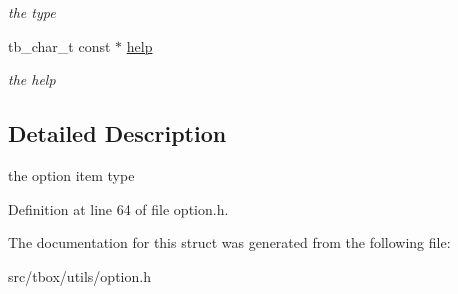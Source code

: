 \begin{DoxyCompactItemize}
\begin{DoxyCompactList}\small\item\em the type \end{DoxyCompactList}\item 
\hypertarget{structtb__option__item__t_a4e2748559ff06e4af089975e5827ff31}{tb\-\_\-char\-\_\-t const $\ast$ \hyperlink{structtb__option__item__t_a4e2748559ff06e4af089975e5827ff31}{help}}\label{structtb__option__item__t_a4e2748559ff06e4af089975e5827ff31}

\begin{DoxyCompactList}\small\item\em the help \end{DoxyCompactList}\end{DoxyCompactItemize}


\subsection{Detailed Description}
the option item type 

Definition at line 64 of file option.\-h.



The documentation for this struct was generated from the following file\-:\begin{DoxyCompactItemize}
\item 
src/tbox/utils/option.\-h\end{DoxyCompactItemize}
